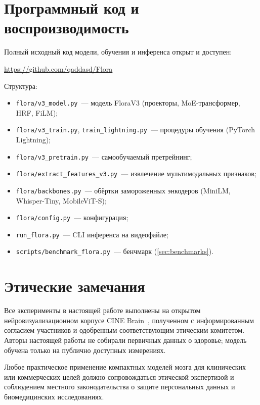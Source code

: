 \documentclass[11pt,a4paper]{article}
\begin{document}
\section{Программный код и воспроизводимость}
\label{app:repo}

Полный исходный код модели, обучения и инференса открыт и доступен:
\begin{center}
\url{https://github.com/qaddasd/Flora}
\end{center}

Структура:
\begin{itemize}[leftmargin=*]
    \item \texttt{flora/v3\_model.py}~--- модель FloraV3 (проекторы,
          MoE-трансформер, HRF, FiLM);
    \item \texttt{flora/v3\_train.py}, \texttt{train\_lightning.py}~---
          процедуры обучения (PyTorch Lightning);
    \item \texttt{flora/v3\_pretrain.py}~--- самообучаемый
          претрейнинг;
    \item \texttt{flora/extract\_features\_v3.py}~--- извлечение
          мультимодальных признаков;
    \item \texttt{flora/backbones.py}~--- обёртки замороженных
          энкодеров (MiniLM, Whisper-Tiny, MobileViT-S);
    \item \texttt{flora/config.py}~--- конфигурация;
    \item \texttt{run\_flora.py}~--- CLI инференса на видеофайле;
    \item \texttt{scripts/benchmark\_flora.py}~--- бенчмарк
          (\cref{sec:benchmarks}).
\end{itemize}

\section{Этические замечания}
\label{app:ethics}

Все эксперименты в настоящей работе выполнены на открытом
нейровизуализационном корпусе CINE Brain~\cite{Gao2025cinebrain},
полученном с информированным согласием участников и одобренным
соответствующим этическим комитетом. Авторы настоящей работы не
собирали первичных данных о здоровье; модель обучена только на
публично доступных измерениях.

Любое практическое применение компактных моделей мозга для
клинических или коммерческих целей должно сопровождаться
этической экспертизой и соблюдением местного законодательства о
защите персональных данных и биомедицинских исследованиях.
\end{document}
